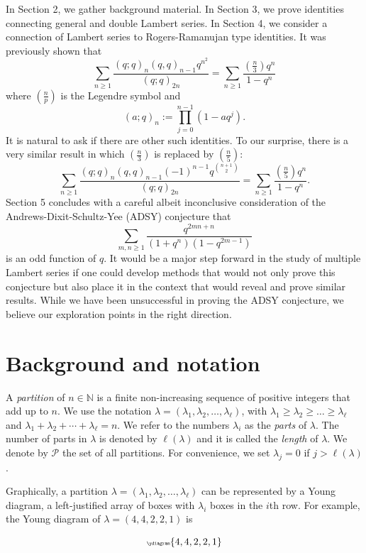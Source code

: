 \documentclass[a4paper,reqno,12pt]{amsart}
\begin{document}
In Section 2, we gather background material. In Section 3, we prove identities connecting general and double Lambert series. In Section 4, we consider a connection of Lambert series to Rogers-Ramanujan type identities. It was previously shown \cite[eq'n (4.7)]{Andrews5} that
$$\sum_{n\geq1} \frac{(q;q)_n(q,q)_{n-1}q^{n^2}}{(q;q)_{2n}}
=\sum_{n\geq1}  \frac{(\frac{n}3)q^n}{1-q^n}$$
where $(\frac{n}p)$ is the Legendre symbol and 
$$(a;q)_n:=\prod_{j=0}^{n-1}(1-aq^j).$$
It is natural to ask if there are other such identities. To our surprise, there is a very similar result in which $(\frac{n}3)$ is replaced by $(\frac{n}5)$:
$$\sum_{n\geq1} \frac{(q;q)_n(q,q)_{n-1}(-1)^{n-1}q^{\binom{n+1}2}}{(q;q)_{2n}}
=\sum_{n\geq1}  \frac{(\frac{n}5)q^n}{1-q^n}.$$
Section 5 concludes with a careful albeit inconclusive consideration of the Andrews-Dixit-Schultz-Yee (ADSY) conjecture \cite{Andrews2} that
$$\sum_{m,n\geq1} \frac{q^{2mn+n}}{(1+q^n)(1-q^{2m-1})}$$
is an odd function of $q$. It would be a major step forward in the study of multiple Lambert series if one could develop methods that would not only prove this conjecture but also place it in the context that would reveal and prove similar results. While we have been unsuccessful in proving the ADSY conjecture, we believe our exploration points in the right direction.


\section{Background and notation}

A {\it partition}  of $n\in\mathbb{N}$ is a finite non-increasing sequence of positive integers that add up to $n$. We use the notation $\lambda=(\lambda_1,\lambda_2,\dots,\lambda_{\ell})$, with $\lambda_1\geq\lambda_2\geq \ldots \geq \lambda_\ell$ and 
$\lambda_1+\lambda_2+\cdots+\lambda_{\ell}=n$. We refer to the numbers $\lambda_i$ as the {\it parts} of $\lambda$. The number of parts in $\lambda$ is denoted by $\ell(\lambda)$ and it is called the \textit{length} of $\lambda$. We denote by $\mathcal P$ the set of all partitions.  For convenience, we set $\lambda_j=0$ if $j>\ell(\lambda)$.

Graphically, a partition $\lambda=(\lambda_1,\lambda_2,\dots,\lambda_{\ell})$ can be represented by a Young diagram, a left-justified array of boxes with $\lambda_i$ boxes in the $i$th row. For example, the Young diagram of $\lambda=(4,4,2,2,1)$ is 

$$\tiny\ydiagram{4,4,2,2,1}$$
\end{document}
